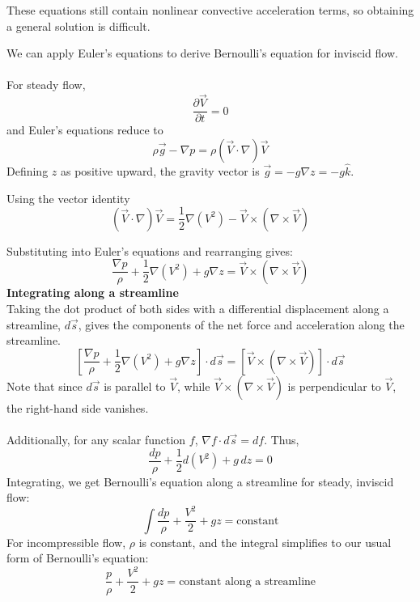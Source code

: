 ﻿\documentclass[12pt]{article}
\begin{document}
These equations still contain nonlinear convective acceleration terms, so obtaining a general solution is difficult.
\begin{notebox}
We can apply Euler's equations to derive Bernoulli's equation for inviscid flow.\\\\
For steady flow,
\[
\frac{\partial\vec V}{\partial t}=0
\]
and Euler's equations reduce to
\[
\rho\vec g-\nabla p=\rho(\vec V\cdot\nabla)\vec V
\]
Defining $z$ as positive upward, the gravity vector is $\vec g = - g \nabla z = - g \hat{k}$.

Using the vector identity
\[
(\vec V\cdot\nabla)\vec V=\frac12\nabla(V^2)-\vec V\times(\nabla\times\vec V)
\]

Substituting into Euler's equations and rearranging gives:
\[
\frac{\nabla p}{\rho}+\frac12\nabla(V^2)+g\nabla z=\vec V\times(\nabla\times\vec V)
\]
\textbf{Integrating along a streamline}\\
Taking the dot product of both sides with a differential displacement along a streamline, $d\vec s$, gives the components of the net force and acceleration along the streamline.
\[
\left[\frac{\nabla p}{\rho}+\frac12\nabla(V^2)+g\nabla z\right]\cdot d\vec s=[\vec V\times(\nabla\times\vec V)]\cdot d\vec s
\]
Note that since $d\vec s$ is parallel to $\vec V$, while \(\vec V\times(\nabla\times\vec V)\) is perpendicular to \(\vec V\), the right-hand side vanishes. \\\\
Additionally, for any scalar function \(f\), \(\nabla f\cdot d\vec s=df\). Thus, 
\[
\frac{dp}{\rho}+\frac12d(V^2)+g\,dz=0
\]
Integrating, we get Bernoulli's equation along a streamline for steady, inviscid flow:
\[
\int\frac{dp}{\rho}+\frac{V^2}{2}+gz=\text{constant}
\]
For incompressible flow, \(\rho\) is constant, and the integral simplifies to our usual form of Bernoulli's equation:
\[
\frac{p}{\rho}+\frac{V^2}{2}+gz=\text{constant along a streamline}
\]
\end{notebox}
\end{document}
